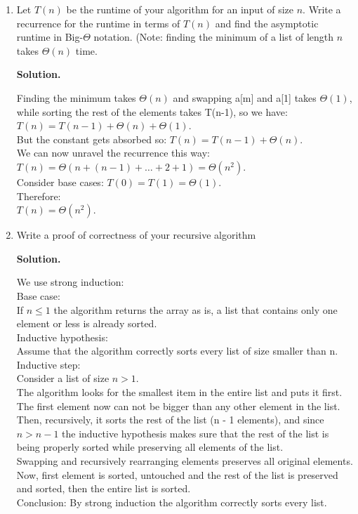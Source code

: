 \documentclass[10pt,letterpaper,unboxed,cm]{article}
\newenvironment{solution}
  {\par\medskip\noindent\textbf{Solution.}\ }
  {\par\medskip}
\begin{document}
\begin{enumerate}
\begin{enumerate}
\begin{solution}
\end{solution}

\item
Let $T(n)$ be the runtime of your algorithm for an input of size $n$. Write a recurrence for the runtime in terms of $T(n)$ and find the asymptotic runtime in Big-$\Theta$ notation. (Note: finding the minimum of a list of length $n$ takes $\Theta(n)$ time.

\begin{solution}
	
	Finding the minimum takes $\Theta(n)$ and swapping a[m] and a[1] takes $\Theta(1)$, while sorting the rest of the elements takes T(n-1), so we have:\\
	\(T(n) = T(n - 1) + \Theta(n) + \Theta(1)\).\\
	But the constant gets absorbed so: \(T(n) = T(n - 1) + \Theta(n)\).\\
	We can now unravel the recurrence this way:\\
	\(T(n) = \Theta(n + (n - 1) + \dots + 2 + 1) = \Theta(n^2)\).\\
	Consider base cases: $T(0) = T(1) = \Theta(1)$.\\
	Therefore:\\
	\(\boxed{T(n) = \Theta(n^2)}\).

\end{solution}

\item
Write a proof of correctness of your recursive algorithm

\begin{solution}
	
	We use strong induction:\\
	Base case:\\
	If $n \leq 1$ the algorithm returns the array as is, a list that contains only one element or less is already sorted.\\
	Inductive hypothesis:\\
	Assume that the algorithm correctly sorts every list of size smaller than n.\\
	Inductive step:\\
	Consider a list of size $n > 1$.\\
	The algorithm looks for the smallest item in the entire list and puts it first. The first element now can not be bigger than any other element in the list.\\
	Then, recursively, it sorts the rest of the list (n - 1 elements), and since $n > n - 1$ the inductive hypothesis makes sure that the rest of the list is being properly sorted while preserving all elements of the list.\\
	Swapping and recursively rearranging elements preserves all original elements.\\
	Now, first element is sorted, untouched and the rest of the list is preserved and sorted, then the entire list is sorted.\\ 
	Conclusion: By strong induction the algorithm correctly sorts every list.


\end{solution}
\end{enumerate}
\end{enumerate}
\end{document}
